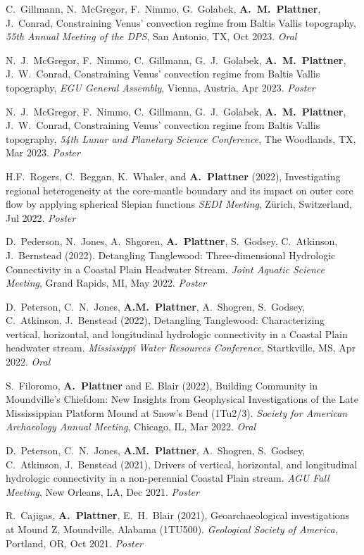\documentclass[10pt]{article}
\begin{document}
\spcp C.~Gillmann, N.~McGregor, F.~Nimmo, G.~Golabek, \textbf{A.~M.~Plattner}, J.~Conrad, Constraining Venus' convection regime from Baltis Vallis topography, \emph{55th Annual Meeting of the DPS}, San Antonio, TX, Oct 2023. \emph{Oral}

\spcp N.~J.~McGregor, F.~Nimmo, C.~Gillmann, G.~J.~Golabek, \textbf{A.~M.~Plattner}, J.~W.~Conrad, Constraining Venus' convection regime from Baltis Vallis topography, \emph{EGU General Assembly}, Vienna, Austria, Apr 2023. \emph{Poster}

\spcp N.~J.~McGregor, F.~Nimmo, C.~Gillmann, G.~J.~Golabek, \textbf{A.~M.~Plattner}, J.~W.~Conrad, Constraining Venus' convection regime from Baltis Vallis topography, \emph{54th Lunar and Planetary Science Conference}, The Woodlands, TX, Mar 2023. \emph{Poster}

\spcp H.F.~Rogers, C.~Beggan, K.~Whaler, and \textbf{A.~Plattner}
(2022), Investigating regional heterogeneity at the core-mantle
boundary and its impact on outer core flow by applying spherical
Slepian functions \emph{SEDI Meeting}, Z\"urich, Switzerland, Jul 2022. \emph{Poster}

\spcp D.~Pederson, N.~Jones, A.~Shgoren, \textbf{A.~Plattner},
S.~Godsey, C.~Atkinson, J.~Bernstead (2022). Detangling Tanglewood:
Three-dimensional Hydrologic Connectivity in a Coastal Plain Headwater
Stream. \emph{Joint Aquatic Science Meeting}, Grand Rapids, MI, May
2022. \emph{Poster}

\spcp D.~Peterson, C.~N.~Jones, \textbf{A.M.~Plattner}, A.~Shogren,
S.~Godsey, C.~Atkinson, J.~Benstead (2022), Detangling Tanglewood:
Characterizing vertical, horizontal, and longitudinal hydrologic
connectivity in a Coastal Plain headwater stream. \emph{Mississippi
Water Resources Conference}, Startkville, MS, Apr 2022.  \emph{Oral}

\spcp S.~Filoromo, \textbf{A.~Plattner} and E. Blair (2022), Building
Community in Moundville's Chiefdom: New Insights from Geophysical
Investigations of the Late Mississippian Platform Mound at Snow's Bend
(1Tu2/3). \emph{Society for American Archaeology Annual Meeting}, Chicago,
IL, Mar 2022. \emph{Oral}

\spcp D.~Peterson, C.~N.~Jones, \textbf{A.M.~Plattner}, A.~Shogren,
S.~Godsey, C.~Atkinson, J.~Benstead (2021), Drivers of vertical,
horizontal, and longitudinal hydrologic connectivity in a
non-perennial Coastal Plain stream. \emph{AGU Fall Meeting}, New
Orleans, LA, Dec 2021. \emph{Poster}

\spcp R.~Cajigas, \textbf{A.~Plattner}, E.~H.~Blair (2021),
Geoarchaeological investigations at Mound Z, Moundville, Alabama
(1TU500). \emph{Geological Society of America}, Portland, OR, Oct
2021. \emph{Poster}
\end{document}
